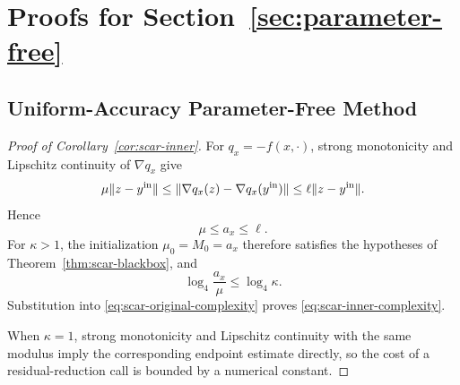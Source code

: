 \section{Proofs for Section~\ref{sec:parameter-free}}
\label{app:parameter-free-proofs}


\subsection{Uniform-Accuracy Parameter-Free Method}
\label{app:uniform-parameter-free-proofs}


\begin{proof}[Proof of Corollary~\ref{cor:scar-inner}]
For $q_x=-f(x,\cdot)$, strong monotonicity and Lipschitz continuity
of $\nabla q_x$ give
\[
    \mu\|z-y^{\rm in}\|
    \le
    \|\nabla q_x(z)-\nabla q_x(y^{\rm in})\|
    \le
    \ell\|z-y^{\rm in}\|.
\]
Hence
\[
    \mu\le a_x\le\ell.
\]
For $\kappa>1$, the initialization
$\mu_0=M_0=a_x$ therefore satisfies the hypotheses of
Theorem~\ref{thm:scar-blackbox}, and
\[
    \log_4\frac{a_x}{\mu}
    \le
    \log_4\kappa.
\]
Substitution into \eqref{eq:scar-original-complexity} proves
\eqref{eq:scar-inner-complexity}.

When $\kappa=1$, strong monotonicity and Lipschitz continuity with the
same modulus imply the corresponding endpoint estimate directly, so
the cost of a residual-reduction call is bounded by a numerical
constant.
\end{proof}


